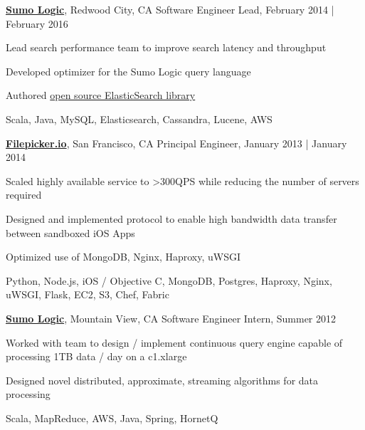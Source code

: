 \documentclass[10pt]{article}
\newenvironment{outerlist}[1][\enskip\textbullet]%
        {\begin{itemize}[#1]}{\end{itemize}%
         \vspace{-.6\baselineskip}}
\newenvironment{innerlist}[1][\enskip\textbullet]%
        {\begin{compactitem}[#1]}{\end{compactitem}}
\newcommand{\blankline}{\quad\pagebreak[2]}
\begin{document}
\blankline

\href{http://www.sumologic.com/}{\textbf{Sumo Logic}}, Redwood City, CA \hfill{Software Engineer Lead, February 2014  | February 2016}
 \begin{outerlist}
	\item[] \begin{innerlist}[-]
		\item Lead search performance team to improve search latency and throughput
		\item Developed optimizer for the Sumo Logic query language
          	\item Authored \href{https://github.com/SumoLogic/elasticsearch-client}{open source ElasticSearch library}
		\item Scala, Java, MySQL, Elasticsearch, Cassandra, Lucene, AWS
	    \end{innerlist}
\end{outerlist}

\blankline

\href{http://www.filestack.com/}{\textbf{Filepicker.io}}, San Francisco, CA \hfill{Principal Engineer, January 2013  | January 2014}
 \begin{outerlist}
 	\item[] \begin{innerlist}[-]
		\item Scaled highly available service to \textgreater 300QPS while reducing the
number of servers required
		\item Designed and implemented protocol to enable high bandwidth data
transfer between sandboxed iOS Apps
		\item Optimized use of MongoDB, Nginx, Haproxy, uWSGI
		\item Python, Node.js, iOS / Objective C, MongoDB, Postgres, Haproxy,
Nginx, uWSGI, Flask, EC2, S3, Chef, Fabric
	\end{innerlist}
\end{outerlist}

\blankline

\href{http://www.sumologic.com/}{\textbf{Sumo Logic}}, Mountain View, CA \hfill{Software Engineer Intern, Summer 2012}
 \begin{outerlist}
 	\item[] \begin{innerlist}[-]
		\item Worked with team to design / implement continuous query engine
capable of processing 1TB data / day on a c1.xlarge
	\item Designed novel distributed, approximate, streaming algorithms for
data processing
	\item Scala, MapReduce, AWS, Java, Spring, HornetQ
	\end{innerlist}
\end{outerlist}
\blankline
\end{document}
